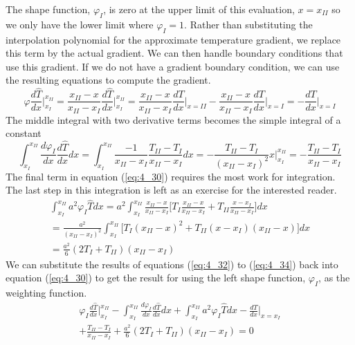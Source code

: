 \documentclass[12pt]{report}
\newcommand{\spn}[1]{\\[#1cm]}
\newcommand{\refn}[1]{(\ref{#1})}
\newcommand{\refx}[1]{\refn{eq:#1}}
\newcommand{\NI}{\noindent}
\newcommand{\dsp}{\displaystyle}
\begin{document}
	\NI The shape function, $\varphi_I$, is zero at the upper limit of this evaluation, $x = x_{II}$ so we only have the lower limit where $\varphi_I = 1$. Rather than substituting the interpolation polynomial for the approximate temperature gradient, we replace this term by the actual gradient. We can then handle boundary conditions that use this gradient. If we do not have a gradient boundary condition, we can use the resulting equations to compute the gradient.
	\begin{equation}
		\varphi\frac{d\hat{T}}{dx}\Biggl|_{x_{I}}^{x_{II}} = \frac{x_{II} - x}{x_{II} - x_I}\frac{d\hat{T}}{dx}\Biggl|_{x_{I}}^{x_{II}} = \frac{x_{II} - x}{x_{II} - x_I}\frac{dT}{dx}\Biggl|_{x=II}-\frac{x_{II} - x}{x_{II} - x_I}\frac{dT}{dx}\Biggl|_{x=I} = - \frac{dT}{dx}\Biggl|_{x=I} \label{eq:4_32}
	\end{equation}
	The middle integral with two derivative terms becomes the simple integral of a constant
	\begin{equation}
		\int_{x_{I}}^{x_{II}}\frac{d\varphi_I}{dx}\frac{d\hat{T}}{dx}dx = \int_{x_{I}}^{x_{II}}\frac{-1}{x_{II} - x_I}\frac{T_{II} - T_I}{x_{II} - x_I}dx = - \frac{T_{II} - T_I}{(x_{II}-x_I)^2}x\Biggl|_{x_I}^{x_{II}} = -\frac{T_{II} - T_I}{x_{II} - x_I} \label{eq:4_33}
	\end{equation}
	The final term in equation \refx{4_30} requires the most work for integration. The last step in this integration is left as an exercise for the interested reader.
	\begin{equation}
		\begin{array}{l}
			\dsp\int_{x_{I}}^{x_{II}}a^2\varphi_I\hat{T} dx = a^2\int_{x_{I}}^{x_{II}}\frac{x_{II}- x}{x_{II} - x_I}\Biggl[T_I\frac{x_{II} - x}{x_{II} - x_I} + T_{II}\frac{x-x_I}{x_{II} - x_I}\Biggr] dx\spn{0.5}
			\dsp = \frac{a^2}{(x_{II}-x_I)^2}\int_{x_{I}}^{x_{II}}\Biggl[T_I(x_{II}-x)^2 + T_{II}(x-x_I)(x_{II}-x)\Biggr]dx\spn{0.5}
			\dsp= \frac{a^2}{6}(2T_I + T_{II})(x_{II} - x_I)
		\end{array}
		\label{eq:4_34}
	\end{equation}
	We can substitute the results of equations \refx{4_32} to \refx{4_34} back into equation \refx{4_30} to get the result for using the left shape function, $\varphi_I$, as the weighting function.
	\begin{equation}
		\begin{array}{l}
			\dsp \varphi_I\frac{d\hat{T}}{dx}\Biggl|_{x_I}^{x_{II}} - \int_{x_{I}}^{x_{II}}\frac{d\varphi_{I}}{dx}\frac{d\hat{T}}{dx}dx + \int_{x_{I}}^{x_{II}}a^2\varphi_{I}\hat{T} dx - \frac{dT}{dx}\Biggl|_{x=x_I}\spn{0.8}
			\dsp+ \frac{T_{II} - T_I}{x_{II} - x_I} + \frac{a^2}{6}(2T_I + T_{II})(x_{II}-x_I) = 0 
		\end{array}\label{eq:4_35}
	\end{equation}
\end{document}
